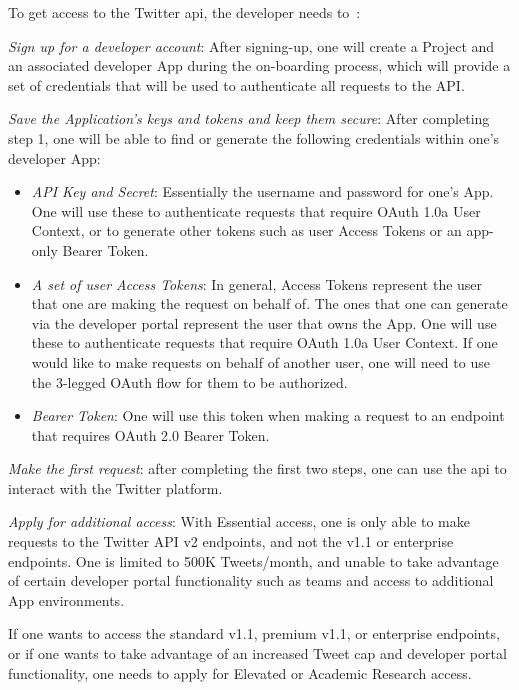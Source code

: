 To get access to the Twitter \gls{api}, the developer needs to~\cite{twitterAPIGettingStarted}:
\begin{enum-c}
\item
  \emph{Sign up for a developer account}: After signing-up, one will create a
  Project and an associated developer App during the on-boarding process, which
  will provide a set of credentials that will be used to authenticate all
  requests to the API.
\item
  \emph{Save the Application's keys and tokens and keep them secure}:
After completing step 1, one will be able to find or generate the following
credentials within one's developer App:
\begin{itemize}
\item 
    \emph{API Key and Secret}: Essentially the username and password for one's App. One
    will use these to authenticate requests that require OAuth 1.0a User
    Context, or to generate other tokens such as user Access Tokens or an
    app-only Bearer Token.
  \item 
    \emph{A set of user Access Tokens}: In general, Access Tokens represent the user
    that one are making the request on behalf of. The ones that one can generate
    via the developer portal represent the user that owns the App. One will use
    these to authenticate requests that require OAuth 1.0a User Context. If one
    would like to make requests on behalf of another user, one will need to use
    the 3-legged OAuth flow for them to be authorized. 
  \item 
    \emph{Bearer Token}: One will use this token when making a request to an endpoint that requires OAuth 2.0 Bearer Token.
\end{itemize}

\item
  \emph{Make the first request}: after completing the first two steps, one can
  use the \gls{api} to interact with the Twitter platform.
\item
  \emph{Apply for additional access}:
  With Essential access, one is only able to make requests to the Twitter API v2
  endpoints, and not the v1.1 or enterprise endpoints.  One is limited to 500K Tweets/month, and unable to take advantage of certain developer portal functionality such as teams and access to additional App environments. 

If one wants to access the standard v1.1, premium v1.1, or enterprise endpoints,
or if one wants to take advantage of an increased Tweet cap and developer portal
functionality, one needs to apply for Elevated or Academic Research access. 
\end{enum-c}

